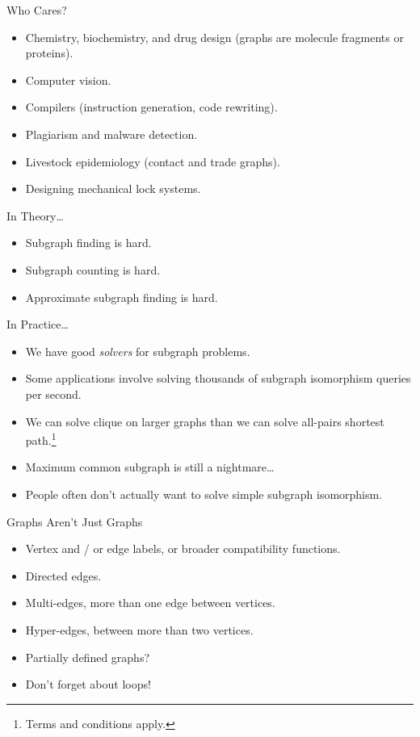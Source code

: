 \documentclass[aspectratio=169,compress,10pt]{beamer}
\begin{document}
\begin{frame}{Who Cares?}
    \begin{itemize}
        \item Chemistry, biochemistry, and drug design (graphs are molecule fragments or proteins).
        \item Computer vision.
        \item Compilers (instruction generation, code rewriting).
        \item Plagiarism and malware detection.
        \item Livestock epidemiology (contact and trade graphs).
        \item Designing mechanical lock systems.
    \end{itemize}
\end{frame}

\begin{frame}{In Theory\ldots}
    \begin{itemize}
        \item Subgraph finding is hard.
        \item Subgraph counting is hard.
        \item Approximate subgraph finding is hard.
    \end{itemize}
\end{frame}

\begin{frame}{In Practice\ldots}
    \begin{itemize}
        \item We have good \emph{solvers} for subgraph problems.
        \item Some applications involve solving thousands of subgraph isomorphism queries per second.
        \item We can solve clique on larger graphs than we can solve all-pairs
            shortest path.\footnote{Terms and conditions apply.}
        \item<2-> Maximum common subgraph is still a nightmare\ldots
        \item<3-> People often don't actually want to solve simple subgraph isomorphism.
    \end{itemize}
\end{frame}

\begin{frame}{Graphs Aren't Just Graphs}
    \begin{itemize}
        \item Vertex and / or edge labels, or broader compatibility functions.
        \item Directed edges.
        \item Multi-edges, more than one edge between vertices.
        \item Hyper-edges, between more than two vertices.
        \item Partially defined graphs?
        \item <2-> Don't forget about loops!
    \end{itemize}
\end{frame}
\end{document}
